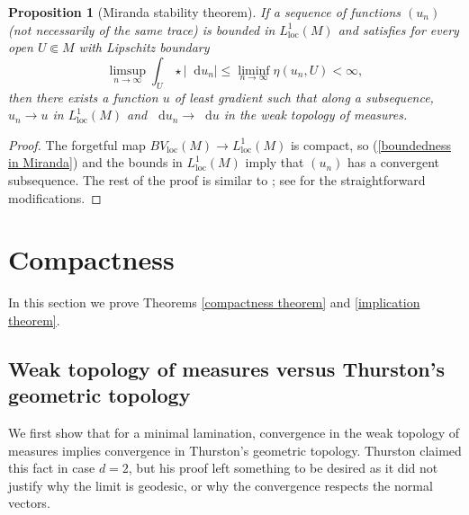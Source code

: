 \documentclass[reqno,11pt]{amsart}
\newcommand*\dif{\mathop{}\!\mathrm{d}}
\newcommand{\loc}{\mathrm{loc}}
\newtheorem{proposition}[theorem]{Proposition}
\theoremstyle{definition}
\numberwithin{equation}{section}
\begin{document}
\begin{proposition}[Miranda stability theorem]
	If a sequence of functions $(u_n)$ (not necessarily of the same trace) is bounded in $L^1_\loc(M)$ and satisfies for every open $U \Subset M$ with Lipschitz boundary
\begin{equation}\label{boundedness in Miranda}
	\limsup_{n \to \infty} \int_U \star |\dif u_n| \leq \liminf_{n \to \infty} \eta(u_n, U) < \infty,
\end{equation}
	then there exists a function $u$ of least gradient such that along a subsequence, $u_n \to u$ in $L^1_\loc(M)$ and $\dif u_n \to \dif u$ in the weak topology of measures.
\end{proposition}
\begin{proof}
The forgetful map $BV_\loc(M) \to L^1_\loc(M)$ is compact, so (\ref{boundedness in Miranda}) and the bounds in $L^1_\loc(M)$ imply that $(u_n)$ has a convergent subsequence.
The rest of the proof is similar to \cite[Teorema 3 and Osservazione 3]{Miranda67}; see \cite[\S2]{BackusFLG} for the straightforward modifications.
\end{proof}

\section{Compactness}\label{CompactnessSec}
In this section we prove Theorems \ref{compactness theorem} and \ref{implication theorem}.

\subsection{Weak topology of measures versus Thurston's geometric topology}
We first show that for a minimal lamination, convergence in the weak topology of measures implies convergence in Thurston's geometric topology.
Thurston claimed this fact \cite[Proposition 8.10.3]{thurston1979geometry} in case $d = 2$, but his proof left something to be desired as it did not justify why the limit is geodesic, or why the convergence respects the normal vectors.
\end{document}
